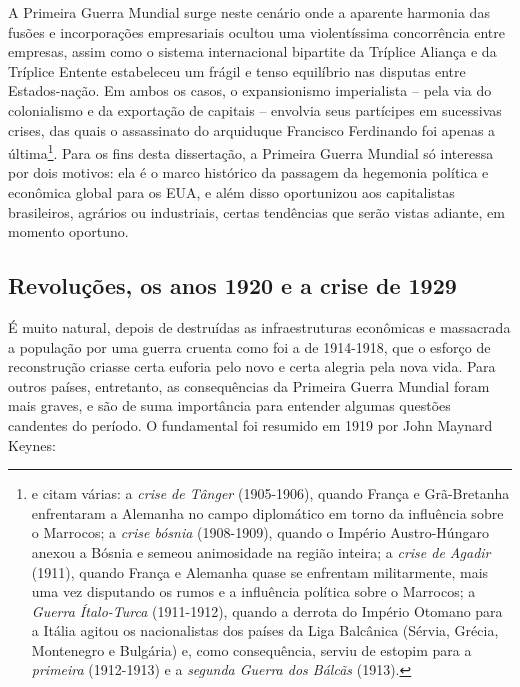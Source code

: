 A Primeira Guerra Mundial surge neste cenário onde a aparente harmonia das fusões e incorporações empresariais ocultou uma violentíssima concorrência entre empresas, assim como o sistema internacional bipartite da Tríplice Aliança e da Tríplice Entente estabeleceu um frágil e tenso equilíbrio nas disputas entre Estados-nação. Em ambos os casos, o expansionismo imperialista -- pela via do colonialismo e da exportação de capitais -- envolvia seus partícipes em sucessivas crises, das quais o assassinato do arquiduque Francisco Ferdinando foi apenas a última\footnote{ e  citam várias: a \textit{crise de Tânger} (1905-1906), quando França e Grã-Bretanha enfrentaram a Alemanha no campo diplomático em torno da influência sobre o Marrocos; a \textit{crise bósnia} (1908-1909), quando o Império Austro-Húngaro anexou a Bósnia e semeou animosidade na região inteira; a \textit{crise de Agadir} (1911), quando França e Alemanha quase se enfrentam militarmente, mais uma vez disputando os rumos e a influência política sobre o Marrocos; a \textit{Guerra Ítalo-Turca} (1911-1912), quando a derrota do Império Otomano para a Itália agitou os nacionalistas dos países da Liga Balcânica (Sérvia, Grécia, Montenegro e Bulgária) e, como consequência, serviu de estopim para a \textit{primeira} (1912-1913) e a \textit{segunda Guerra dos Bálcãs} (1913).}. Para os fins desta dissertação, a Primeira Guerra Mundial só interessa por dois motivos: ela é o marco histórico da passagem da hegemonia política e econômica global para os EUA, e além disso oportunizou aos capitalistas brasileiros, agrários ou industriais, certas tendências que serão vistas adiante, em momento oportuno.

\subsection{Revoluções, os anos 1920 e a crise de 1929}

É muito natural, depois de destruídas as infraestruturas econômicas e massacrada a população por uma guerra cruenta como foi a de 1914-1918, que o esforço de reconstrução criasse certa euforia pelo novo e certa alegria pela nova vida. Para outros países, entretanto, as consequências da Primeira Guerra Mundial foram mais graves, e são de suma importância para entender algumas questões candentes do período. O fundamental foi resumido em 1919 por John Maynard Keynes:

